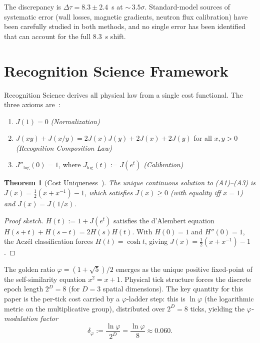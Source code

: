 \documentclass[12pt,a4paper]{article}
\newtheorem{theorem}{Theorem}[section]
\theoremstyle{definition}
\theoremstyle{remark}
\begin{document}
The discrepancy is $\Delta\tau = 8.3 \pm 2.4$~s at ${\sim}\,3.5\sigma$.
Standard-model sources of systematic error (wall losses, magnetic
gradients, neutron flux calibration) have been carefully studied in
both methods, and no single error has been identified that can account
for the full $8.3$~s shift.

\section{Recognition Science Framework}
\label{sec:framework}

Recognition Science derives all physical law from a single cost
functional.  The three axioms are~\cite{RS_Axioms}:
\begin{enumerate}[label=(A\arabic*),nosep]
  \item $J(1) = 0$ \hfill \textit{(Normalization)}
  \item $J(xy) + J(x/y) = 2J(x)J(y) + 2J(x) + 2J(y)$ for all $x, y > 0$
  \hfill \textit{(Recognition Composition Law)}
  \item $J''_{\log}(0) = 1$, where $J_{\log}(t) := J(e^t)$
  \hfill \textit{(Calibration)}
\end{enumerate}

\begin{theorem}[Cost Uniqueness~\cite{RS_Axioms}]
\label{thm:J}
The unique continuous solution to (A1)--(A3) is
$J(x) = \tfrac{1}{2}(x + x^{-1}) - 1$, which satisfies $J(x) \geq 0$
(with equality iff $x = 1$) and $J(x) = J(1/x)$.
\end{theorem}

\begin{proof}[Proof sketch]
$H(t) := 1 + J(e^t)$ satisfies the d'Alembert equation
$H(s{+}t) + H(s{-}t) = 2H(s)H(t)$.  With $H(0) = 1$ and $H''(0) = 1$,
the Acz\'el classification forces $H(t) = \cosh t$, giving
$J(x) = \tfrac{1}{2}(x + x^{-1}) - 1$.
\end{proof}

The golden ratio $\varphi = (1+\sqrt{5})/2$ emerges as the unique positive
fixed-point of the self-similarity equation $x^2 = x + 1$.  Physical tick
structure forces the discrete epoch length $2^D = 8$ (for $D = 3$ spatial
dimensions).  The key quantity for this paper is the per-tick cost carried
by a $\varphi$-ladder step: this is $\ln\varphi$ (the logarithmic metric
on the multiplicative group), distributed over $2^D = 8$ ticks, yielding
the \emph{$\varphi$-modulation factor}
\begin{equation}
  \delta_\varphi := \frac{\ln\varphi}{2^D} = \frac{\ln\varphi}{8} \approx 0.060.
  \label{eq:modulation}
\end{equation}
\end{document}
